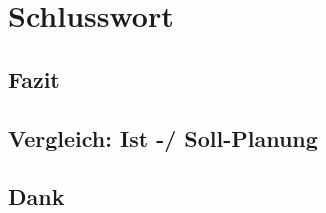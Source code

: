 
\chapter{Schlusswort} \label{chap:Finish}

\section{Fazit}

\section{Vergleich: Ist -/ Soll-Planung}




\section{Dank}
